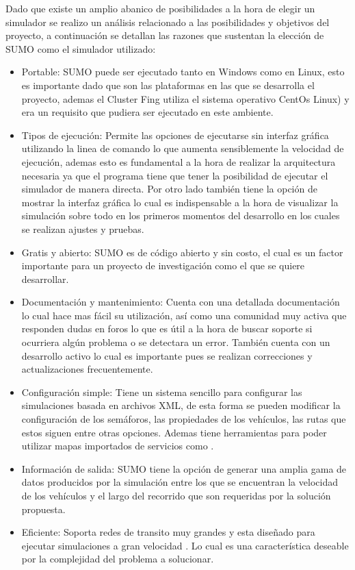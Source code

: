 Dado que existe un amplio abanico de posibilidades a la hora de elegir un simulador se realizo un análisis relacionado a las posibilidades y objetivos del proyecto, a continuación se detallan las razones que sustentan la elección de SUMO como el simulador utilizado:

\begin{itemize}
	\item Portable: SUMO puede ser ejecutado tanto en Windows como en Linux, esto es importante dado que son las plataformas en las que se desarrolla el proyecto, ademas el Cluster Fing utiliza el sistema operativo CentOs Linux) y era un requisito que pudiera ser ejecutado en este ambiente.
	
	\item Tipos de ejecución: Permite las opciones de ejecutarse sin interfaz gráfica utilizando la linea de comando lo que aumenta sensiblemente la velocidad de ejecución, ademas esto es fundamental a la hora de realizar la arquitectura necesaria ya que el programa tiene que tener la posibilidad de ejecutar el simulador de manera directa. Por otro lado también tiene la opción de mostrar la interfaz gráfica lo cual es indispensable a la hora de visualizar la simulación sobre todo en los primeros momentos del desarrollo en los cuales se realizan ajustes y pruebas.
	
	\item Gratis y abierto: SUMO es de código abierto y sin costo, el cual es un factor importante para un proyecto de investigación como el que se quiere desarrollar. 
	
	\item Documentación y mantenimiento: Cuenta con una detallada documentación lo cual hace mas fácil su utilización, así como una comunidad muy activa que responden dudas en foros lo que es útil a la hora de buscar soporte si ocurriera algún problema o se detectara un error. También cuenta con un desarrollo activo lo cual es importante pues se realizan correcciones y actualizaciones frecuentemente.
	
	\item Configuración simple: Tiene un sistema sencillo para configurar las simulaciones basada en archivos XML, de esta forma se pueden modificar la configuración de los semáforos, las propiedades de los vehículos, las rutas que estos siguen entre otras opciones. Ademas tiene herramientas para poder utilizar mapas importados de servicios como \citet{OSM}.
	
	\item Información de salida: SUMO tiene la opción de generar una amplia gama de datos producidos por la simulación entre los que se encuentran la velocidad de los vehículos y el largo del recorrido que son requeridas por la solución propuesta. 
	
	\item Eficiente: Soporta redes de transito muy grandes y esta diseñado para ejecutar simulaciones a gran velocidad \citep{sumo2014}. Lo cual es una característica deseable por la complejidad del problema a solucionar.
	
\end{itemize}


